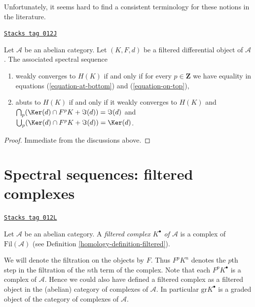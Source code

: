 Unfortunately, it seems hard to find a consistent terminology for these
notions in the literature.

\begin{lemma}
\label{homology-lemma-filtered-differential-ss-converges}
\href{https://stacks.math.columbia.edu/tag/012J}{\texttt{Stacks tag 012J}}

Let $\mathcal{A}$ be an abelian category.
Let $(K, F, d)$ be a filtered differential object of $\mathcal{A}$.
The associated spectral sequence
\begin{enumerate}
\item weakly converges to $H(K)$ if and only if for every
$p \in \mathbf{Z}$ we have equality in equations
(\ref{equation-at-bottom}) and (\ref{equation-on-top}),
\item abuts to $H(K)$ if and only if it weakly converges to $H(K)$ and
$\bigcap_p (\Ker(d) \cap F^pK + \Im(d)) = \Im(d)$
and $\bigcup_p (\Ker(d) \cap F^pK + \Im(d)) = \Ker(d)$.
\end{enumerate}
\end{lemma}

\begin{proof}
Immediate from the discussions above.
\end{proof}

\section{Spectral sequences: filtered complexes}
\label{homology-section-filtered-complex}
\begin{definition}
\label{homology-definition-filtered-complex}
\href{https://stacks.math.columbia.edu/tag/012L}{\texttt{Stacks tag 012L}}

Let $\mathcal{A}$ be an abelian category.
A {\it filtered complex $K^\bullet$ of $\mathcal{A}$}
is a complex of $\text{Fil}(\mathcal{A})$ (see
Definition \ref{homology-definition-filtered}).
\end{definition}

We will denote the filtration on the objects by $F$. Thus
$F^pK^n$ denotes the $p$th step in the filtration of the $n$th term of the
complex. Note that each $F^pK^\bullet$ is a complex of $\mathcal{A}$.
Hence we could also have defined a filtered complex as a filtered object
in the (abelian) category of complexes of $\mathcal{A}$.
In particular $\text{gr} K^\bullet$ is a graded object of the
category of complexes of $\mathcal{A}$.

